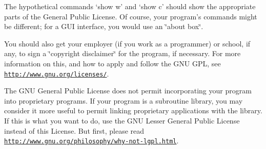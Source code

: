 The hypothetical commands `show w' and `show c' should show the appropriate parts of the General Public License. Of course, your program's commands might be different; for a G\+U\+I interface, you would use an \char`\"{}about box\char`\"{}.

You should also get your employer (if you work as a programmer) or school, if any, to sign a \char`\"{}copyright disclaimer\char`\"{} for the program, if necessary. For more information on this, and how to apply and follow the G\+N\+U G\+P\+L, see \href{http://www.gnu.org/licenses/}{\tt http\+://www.\+gnu.\+org/licenses/}.

The G\+N\+U General Public License does not permit incorporating your program into proprietary programs. If your program is a subroutine library, you may consider it more useful to permit linking proprietary applications with the library. If this is what you want to do, use the G\+N\+U Lesser General Public License instead of this License. But first, please read \href{http://www.gnu.org/philosophy/why-not-lgpl.html}{\tt http\+://www.\+gnu.\+org/philosophy/why-\/not-\/lgpl.\+html}. 